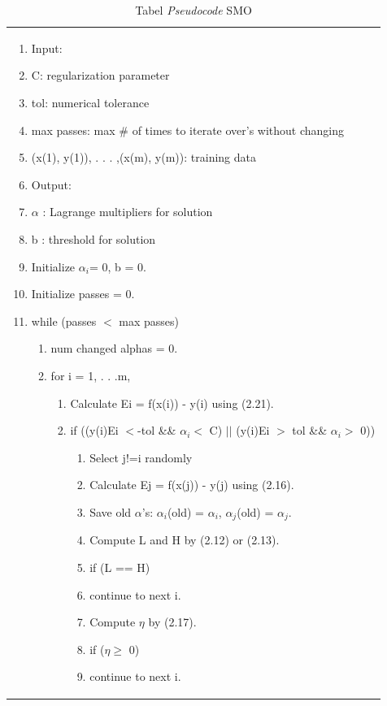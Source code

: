 \begin{table}[H]
	\caption{Tabel \textit{Pseudocode} SMO}
	\centering
	\small
	\begin{adjustbox}{width=1\textwidth}
	\begin{tabular}{|p{13.55cm}|}
			\hline
			\begin{enumerate}[label={},leftmargin=*,noitemsep]
				\item Input:
				\item C: regularization parameter
				\item tol: numerical tolerance
				\item max passes: max \# of times to iterate over's without changing
				\item (x(1), y(1)), . . . ,(x(m), y(m)): training data
				\item Output:
				\item $\alpha$ : Lagrange multipliers for solution
				\item b : threshold for solution
				\item Initialize $\alpha_{i}$= 0, b = 0.
				\item Initialize passes = 0.
				\item while (passes $<$ max passes)
				\begin{enumerate}[label={}]
					\item num changed alphas = 0.
					\item for i = 1, . . .m,
					\begin{enumerate}[label={}]
						\item Calculate Ei = f(x(i)) - y(i) using (2.21).
						\item if ((y(i)Ei $<$-tol \&\& $\alpha_{i }$$<$ C) $||$ (y(i)Ei $>$ tol \&\& $\alpha_{i }$$>$ 0))
						\begin{enumerate}[label={}]
							\item Select j!=i randomly
							\item Calculate Ej = f(x(j)) - y(j) using (2.16).
							\item Save old $\alpha$'s: $\alpha_{i}$(old) = $\alpha_{i}$,{ }$\alpha_{j}$(old) = $\alpha_{j}$. 
							\item Compute L and H by (2.12) or (2.13).
							\item if (L == H)
							\item \quad continue to next i.
							\item Compute $\eta$ by (2.17).
							\item if ($\eta \geq$ 0)
							\item \quad continue to next i.

\end{enumerate}
\end{enumerate}
\end{enumerate}
\end{enumerate}
\end{tabular}
\end{adjustbox}
\end{table}
